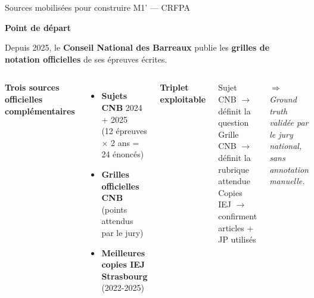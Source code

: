 \documentclass[aspectratio=169,10pt]{beamer}
\newcommand{\keybox}[1]{%
  \begin{center}
  \colorbox{accentsoft}{\parbox{0.92\linewidth}{\centering #1}}
  \end{center}}
\begin{document}
\begin{frame}{Sources mobilisées pour construire M1' --- CRFPA}
  \begin{center}
  \textbf{Point de départ}
  \end{center}

  \keybox{\small Depuis 2025, le \textbf{Conseil National des Barreaux} publie les \textbf{grilles de notation officielles} de ses épreuves écrites.}

  \vspace{0.3em}
  \begin{columns}[T]
    \textbf{Trois sources officielles complémentaires}
    \begin{itemize}\footnotesize
      \item \textbf{Sujets CNB} 2024 + 2025 \\ (12 épreuves $\times$ 2 ans = 24 énoncés)
      \item \textbf{Grilles officielles CNB} \\ (points attendus par le jury)
      \item \textbf{Meilleures copies IEJ Strasbourg} (2022-2025)
    \end{itemize}

    \textbf{Triplet exploitable}
    \vspace{0.3em}
    \begin{center}
    \scriptsize
    Sujet CNB $\rightarrow$ définit la question \\
    Grille CNB $\rightarrow$ définit la rubrique attendue \\
    Copies IEJ $\rightarrow$ confirment articles + JP utilisés
    \end{center}

    \vspace{0.3em}
    \small\textit{$\Rightarrow$ Ground truth validée par le jury national, sans annotation manuelle.}
  \end{columns}
\end{frame}
\end{document}
